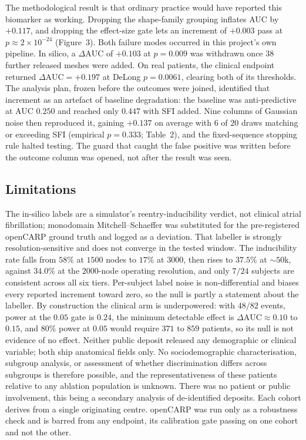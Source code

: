 \documentclass[11pt]{article}
\newcommand{\dAUC}{\ensuremath{\Delta\mathrm{AUC}}}
\begin{document}
The methodological result is that ordinary practice would have reported this
biomarker as working. Dropping the shape-family grouping inflates AUC by
$+0.117$, and dropping the effect-size gate lets an increment of $+0.003$ pass at
$p\approx2\times10^{-24}$ (Figure~3). Both failure modes occurred in this
project's own pipeline. In silico, a $\dAUC$ of $+0.103$ at
$p=0.009$ was withdrawn once $38$ further released meshes were added. On real
patients, the clinical endpoint returned $\dAUC=+0.197$ at DeLong $p=0.0061$,
clearing both of its thresholds. The analysis plan, frozen before the outcomes
were joined, identified that increment as an artefact of baseline degradation:
the baseline was anti-predictive at AUC $0.250$ and reached only $0.447$ with SFI
added. Nine columns of Gaussian noise then reproduced it, gaining $+0.137$ on
average with $6$ of $20$ draws matching or exceeding SFI (empirical $p=0.333$;
Table~2), and the fixed-sequence stopping rule halted testing. The guard that
caught the false positive was written before the outcome column was opened, not
after the result was seen.

\subsection*{Limitations}

The in-silico labels are a simulator's reentry-inducibility verdict,
not clinical atrial fibrillation; monodomain Mitchell--Schaeffer was substituted
for the pre-registered openCARP ground truth and logged as a deviation. That
labeller is strongly resolution-sensitive and does not converge in the tested
window. The inducibility rate falls from $58\%$ at $1500$ nodes to $17\%$ at
$3000$, then rises to $37.5\%$ at $\sim\!50$k, against $34.0\%$ at the
$2000$-node operating resolution, and only $7/24$ subjects are consistent
across all six tiers. Per-subject label noise is non-differential and biases every
reported increment toward zero, so the null is partly a statement about the
labeller. By construction the clinical arm is underpowered: with $48/82$ events,
power at the $0.05$ gate is $0.24$, the minimum detectable effect is
$\dAUC\approx0.10$ to $0.15$, and $80\%$ power at $0.05$ would require $371$ to
$859$ patients, so its null is not evidence of no effect. Neither public deposit
released any demographic or clinical variable; both ship anatomical fields only.
No sociodemographic characterisation, subgroup analysis, or assessment of
whether discrimination differs across subgroups is therefore possible, and the
representativeness of these patients relative to any ablation population is
unknown. There was no patient or public involvement, this being a secondary
analysis of de-identified deposits. Each cohort derives from a single
originating centre. openCARP was run only as a robustness check and is barred
from any endpoint, its calibration gate passing on one cohort and not the other.
\end{document}
